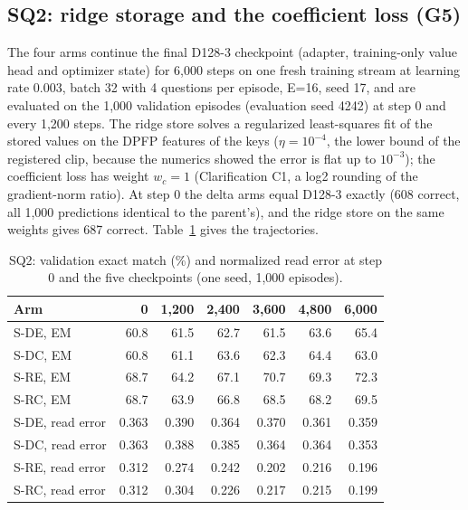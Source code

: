 \subsection{SQ2: ridge storage and the coefficient loss (G5)}

The four arms continue the final D128-3 checkpoint (adapter, training-only value head and optimizer state) for 6,000 steps on one fresh training stream at learning rate 0.003, batch 32 with 4 questions per episode, E=16, seed 17, and are evaluated on the 1,000 validation episodes (evaluation seed 4242) at step 0 and every 1,200 steps.
The ridge store solves a regularized least-squares fit of the stored values on the DPFP features of the keys ($\eta=10^{-4}$, the lower bound of the registered clip, because the numerics showed the error is flat up to $10^{-3}$); the coefficient loss has weight $w_c=1$ (Clarification C1, a log2 rounding of the gradient-norm ratio).
At step 0 the delta arms equal D128-3 exactly (608 correct, all 1,000 predictions identical to the parent's), and the ridge store on the same weights gives 687 correct.  %
Table~\ref{tab:i-sq2} gives the trajectories.

\begin{table}[htbp]
\centering\footnotesize
\caption{SQ2: validation exact match (\%) and normalized read error at step 0 and the five checkpoints (one seed, 1,000 episodes).  %
}
\label{tab:i-sq2}
\begin{tabular}{@{}lrrrrrr@{}}
\toprule
Arm & 0 & 1,200 & 2,400 & 3,600 & 4,800 & 6,000 \\
\midrule
S-DE, EM & 60.8 & 61.5 & 62.7 & 61.5 & 63.6 & 65.4 \\
S-DC, EM & 60.8 & 61.1 & 63.6 & 62.3 & 64.4 & 63.0 \\
S-RE, EM & 68.7 & 64.2 & 67.1 & 70.7 & 69.3 & 72.3 \\
S-RC, EM & 68.7 & 63.9 & 66.8 & 68.5 & 68.2 & 69.5 \\
\midrule
S-DE, read error & 0.363 & 0.390 & 0.364 & 0.370 & 0.361 & 0.359 \\
S-DC, read error & 0.363 & 0.388 & 0.385 & 0.364 & 0.364 & 0.353 \\
S-RE, read error & 0.312 & 0.274 & 0.242 & 0.202 & 0.216 & 0.196 \\
S-RC, read error & 0.312 & 0.304 & 0.226 & 0.217 & 0.215 & 0.199 \\
\bottomrule
\end{tabular}
\end{table}

